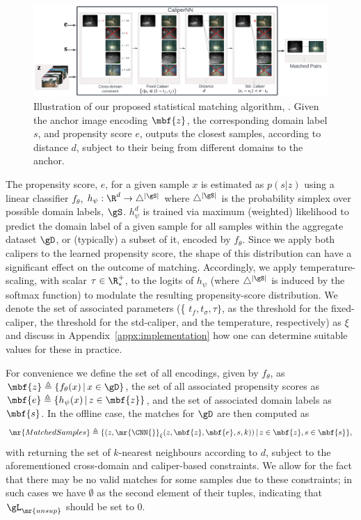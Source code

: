 \begin{figure}[tbp]
  \centering
  \includegraphics[width=1.\textwidth]{figures/CaliperNN_PS_pipeline.pdf}
  \caption{
    Illustration of our proposed statistical matching algorithm, \CNN{}. Given the anchor image
    encoding $\mbf{z}$, the corresponding domain label $s$, and propensity score $e$, \CNN{}
    outputs the closest samples, according to distance $d$, subject to their being from different
    domains to the anchor.
}
  \label{fig:calipernn_pipeline}
\end{figure}

%
The propensity score, $e$, for a given sample $x$ is estimated as $p(s|z)$ using a linear
classifier $f_\theta$, $h_\psi: \R^d \to \bigtriangleup^{|\gS|}$ where
$\bigtriangleup^{|\gS|}$ is the probability simplex over possible domain labels, $\gS$.
$h_\psi^d$ is trained via maximum (weighted) likelihood to predict the domain label of a given
sample for all samples within the aggregate dataset $\gD$, or (typically) a subset of it,
encoded by $f_\theta$.
%
Since we apply both calipers to the learned propensity score, the shape of this distribution can
have a significant effect on the outcome of matching.
%
Accordingly, we apply temperature-scaling, with scalar $\tau \in \R^+_\ast$, to the logits
of $h_\psi$ (where $\bigtriangleup^{|\gS|}$ is induced by the softmax function) to modulate the
resulting propensity-score distribution.
%
We denote the set of associated parameters (\{ $t_{f}, t_{\sigma}, \tau \}$, as the threshold for
the fixed-caliper, the threshold for the std-caliper, and the temperature, respectively) as $\xi$
and discuss in Appendix~\ref{appx:implementation} how one can determine suitable values for these
in practice.

For convenience we define the set of all encodings, given by $f_\theta$, as $\mbf{z} \triangleq \{
f_\theta (x)\, |\, x \in \gD \}$, the set of all associated propensity scores as $\mbf{e}
\triangleq \{ h_\psi (x) \, | \, z \in \mbf{z} \}$, and the set of associated domain labels as
$\mbf{s}$.
%
In the offline case, the matches for $\gD$ are then computed as
%
\begin{equation}
  \mr{MatchedSamples} \triangleq \{ (z,  \mr{\CNN{}}_\xi(z, \mbf{z}, \mbf{e}, s, k)) \, | \, z \in
    \mbf{z}, s \in \mbf{s} \},
\end{equation}
%
with \CNN{} returning the set of $k$-nearest neighbours according to $d$, subject to the
aforementioned cross-domain and caliper-based constraints. We allow for the fact that there may be
no valid matches for some samples due to these constraints; in such cases we have $\emptyset$ as
the second element of their tuples, indicating that $\gL_{\mr{unsup}}$ should be set to $0$.
%


